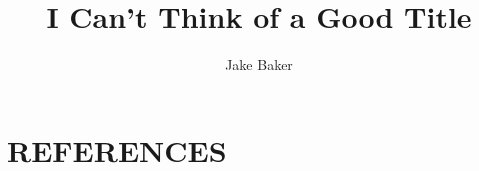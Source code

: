 \documentclass[a4paper]{article}
\begin{document}
\title{I Can't Think of a Good Title}
\author{Jake Baker}

\maketitle
{}
\thispagestyle{empty}




\pagestyle{fancy}
\cfoot{\thepage}
\tableofcontents
\clearpage
\setcounter{page}{1}







\section{REFERENCES}

\clearpage
\printbibliography
\end{document}
